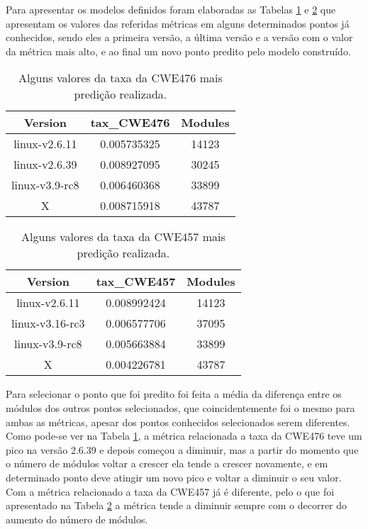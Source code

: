 Para apresentar os modelos definidos foram elaboradas as Tabelas
\ref{tab:cwe476} e \ref{tab:cwe457} que apresentam os valores das referidas
métricas em alguns determinados pontos já conhecidos, sendo eles a primeira
versão, a última versão e a versão com o valor da métrica mais alto, e ao final
um novo ponto predito pelo modelo construído.

\begin{table}[h]
\centering
\begin{tabular}{ccc}
\hline
\rowcolor[HTML]{EFEFEF} 
{Version}  & {tax\_CWE476} & {Modules} \\ \hline
linux-v2.6.11  & 0.005735325       & 14123         \\ \hline
linux-v2.6.39  & 0.008927095       & 30245         \\ \hline
linux-v3.9-rc8 & 0.006460368       & 33899         \\ \hline
X              & 0.008715918       & 43787         \\ \hline
\end{tabular}
\caption{Alguns valores da taxa da CWE476 mais predição realizada.}
\label{tab:cwe476}
\end{table}

\begin{table}[h]
\centering
\begin{tabular}{ccc}
\hline
\rowcolor[HTML]{EFEFEF} 
{Version}   & {tax\_CWE457} & {Modules} \\ \hline
linux-v2.6.11   & 0.008992424       & 14123         \\ \hline
linux-v3.16-rc3 & 0.006577706       & 37095         \\ \hline
linux-v3.9-rc8  & 0.005663884       & 33899         \\ \hline
X               & 0.004226781       & 43787         \\ \hline
\end{tabular}
\caption{Alguns valores da taxa da CWE457 mais predição realizada.}
\label{tab:cwe457}
\end{table}

Para selecionar o ponto que foi predito foi feita a média da diferença entre os
módulos dos outros pontos selecionados, que coincidentemente foi o mesmo para
ambas as métricas, apesar dos pontos conhecidos selecionados serem diferentes.
Como pode-se ver na Tabela \ref{tab:cwe476}, a métrica relacionada a taxa da
CWE476 teve um pico na versão 2.6.39 e depois começou a diminuir, mas a partir do
momento que o número de módulos voltar a crescer ela tende a crescer novamente,
e em determinado ponto deve atingir um novo pico e voltar a diminuir o seu
valor. Com a métrica relacionado a taxa da CWE457 já é diferente, pelo o que foi
apresentado na Tabela \ref{tab:cwe457} a métrica tende a diminuir sempre com o
decorrer do aumento do número de módulos.

